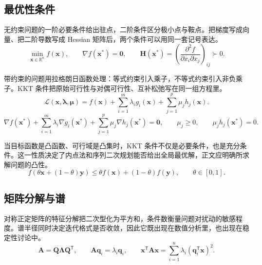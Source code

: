 \subsection{最优性条件}

无约束问题的一阶必要条件给出驻点，二阶条件区分极小点与鞍点。把梯度写成向量、把二阶导数写成 Hessian 矩阵后，两个条件可以用同一套记号表达。
\begin{equation}
  \min_{\bm{x}\in\mathbb{R}^n}f(\bm{x}),\qquad
  \nabla f(\bm{x}^*)=\bm{0},\qquad
  \bm{H}(\bm{x}^*)=
  \left(\frac{\partial^2f}{\partial x_i\partial x_j}\right)_{ij}\succ0.
  \label{eq:optimality}
\end{equation}

带约束的问题用拉格朗日函数处理：等式约束引入乘子，不等式约束引入非负乘子。KKT 条件把原始可行性与对偶可行性、互补松弛写在同一组方程里。
\begin{equation}
  \mathcal{L}(\bm{x},\bm{\lambda},\bm{\mu})
  =f(\bm{x})+\sum_{i=1}^{m}\lambda_i g_i(\bm{x})
  +\sum_{j=1}^{p}\mu_j h_j(\bm{x}).
  \label{eq:lagrangian}
\end{equation}
\begin{equation}
  \nabla f(\bm{x}^*)+\sum_{i=1}^{m}\lambda_i\nabla g_i(\bm{x}^*)
  +\sum_{j=1}^{p}\mu_j\nabla h_j(\bm{x}^*)=\bm{0},\qquad
  \mu_j\geq0,\qquad \mu_jh_j(\bm{x}^*)=0.
  \label{eq:kkt}
\end{equation}

当目标函数是凸函数、可行域是凸集时，KKT 条件不仅是必要条件，也是充分条件。这一性质决定了内点法和序列二次规划能否给出全局最优解，正文应明确所求解问题的凸性。
\begin{equation}
  f(\theta\bm{x}+(1-\theta)\bm{y})
  \leq\theta f(\bm{x})+(1-\theta)f(\bm{y}),\qquad \theta\in[0,1].
  \label{eq:convexity}
\end{equation}

\subsection{矩阵分解与谱}

对称正定矩阵的特征分解把二次型化为平方和，条件数衡量问题对扰动的敏感程度。谱半径同时决定迭代格式是否收敛，因此它既出现在数值分析里，也出现在稳定性讨论中。
\begin{equation}
  \bm{A}=\bm{Q}\bm{\Lambda}\bm{Q}^{\mathsf T},\qquad
  \bm{A}\bm{q}_i=\lambda_i\bm{q}_i,\qquad
  \bm{x}^{\mathsf T}\bm{A}\bm{x}
  =\sum_{i=1}^{n}\lambda_i(\bm{q}_i^{\mathsf T}\bm{x})^2.
  \label{eq:eigen}
\end{equation}

